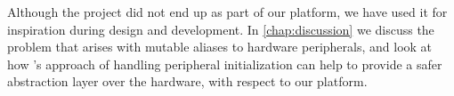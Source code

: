 Although the {\zinc} project did not end up as part of our platform, we have used it for inspiration during design and development.
In \autoref{chap:discussion} we discuss the problem that arises with mutable aliases to hardware peripherals, and look at how {\zinc}'s approach of handling peripheral initialization can help to provide a safer abstraction layer over the hardware, with respect to our platform.
